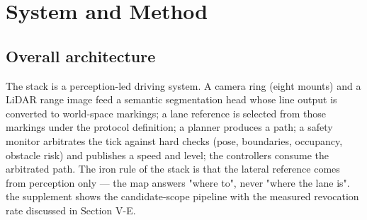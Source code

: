 \documentclass[journal]{IEEEtran}
\begin{document}
\section{System and Method}
\subsection{Overall architecture}
The stack is a perception-led driving system. A camera ring (eight mounts) and a LiDAR range image
feed a semantic segmentation head whose line output is converted to world-space markings; a lane
reference is selected from those markings under the protocol definition; a planner produces a path;
a safety monitor arbitrates the tick against hard checks (pose, boundaries, occupancy, obstacle
risk) and publishes a speed and level; the controllers consume the arbitrated path. The iron rule of
the stack is that the lateral reference comes from perception only --- the map answers "where to",
never "where the lane is". the supplement shows the candidate-scope pipeline with the measured revocation
rate discussed in Section V-E.
\end{document}
